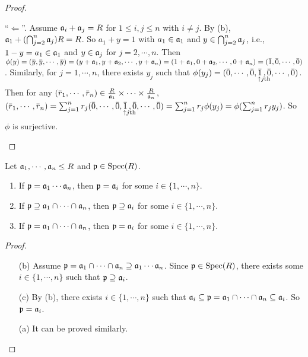 \begin{proof}
\begin{enumerate}
            ``$\Leftarrow$''. Assume $\mathfrak{a}_i + \mathfrak{a}_j = R$ for $1 \leq i,j \leq n$ with $i \neq j$. By (b), $\mathfrak{a}_1 + (\bigcap_{j=2}^n \mathfrak{a}_j)R = R$. So $a_1 + y = 1$ with $a_1 \in \mathfrak{a}_1$ and $y \in \bigcap_{j=2}^n \mathfrak{a}_j$, i.e., $1-y = a_1 \in \mathfrak{a}_1$ and $y \in \mathfrak{a}_j$ for $j = 2,\cdots, n$. Then $\phi(y) = (\overbar y, \overbar y, \cdots, \overbar y) = (y + \ffa_1, y + \ffa_2, \cdots, y + \ffa_n) = (1+\ffa_1,0+\ffa_2,\cdots,0+\ffa_n) = (\overbar 1,\overbar 0, \cdots, \overbar 0)$. Similarly, for $j = 1,\cdots,n$, there exists $y_j$ such that $\phi(y_j) = (\overbar 0, \cdots, \overbar 0, \mathpunct{\underset{\mathclap{\substack{\ \ \ \uparrow j\text{th}\\ \textstyle }}}{\overbar 1}}, \overbar 0, \cdots, \overbar 0)$. Then for any $(\overbar r_1,\cdots, \overbar r_n) \in \frac{R}{\ffa_1} \times \cdots \times \frac{R}{\ffa_n}$, $(\overbar r_1,\cdots, \overbar r_n) = \sum_{j=1}^n r_j(\overbar 0, \cdots, \overbar 0, \mathpunct{\underset{\mathclap{\substack{\ \ \ \uparrow j\text{th} \\ \textstyle }}}{\overbar 1}}, \overbar 0, \cdots, \overbar 0) = \sum_{j=1}^n r_j\phi(y_j) = \phi(\sum_{j=1}^nr_jy_j)$. So $\phi$ is surjective. \qedhere
    \end{enumerate}
\end{proof}

\begin{proposition}\label{1.47}
    Let $\mathfrak{a}_1,\cdots,\mathfrak{a}_n \leq R$ and $\mathfrak{p} \in \operatorname{Spec}(R)$.
    \begin{enumerate}
        \item\label{1.47a} If $\mathfrak{p} = \mathfrak{a}_1 \cdots \mathfrak{a}_n$, then $\mathfrak{p} = \mathfrak{a}_i$ for some $i \in \{1,\cdots,n\}$.
        \item\label{1.47b} If $\mathfrak{p} \supseteq \mathfrak{a}_1 \cap \cdots \cap \mathfrak{a}_n$, then $\mathfrak{p} \supseteq \mathfrak{a}_i$ for some $i \in \{1,\cdots,n\}$.
        \item\label{1.47c} If $\mathfrak{p} = \mathfrak{a}_1 \cap \cdots \cap \mathfrak{a}_n$, then $\mathfrak{p} = \mathfrak{a}_i$ for some $i \in \{1,\cdots,n\}$.
    \end{enumerate}
\end{proposition}

\begin{proof}
    \begin{enumerate}
        \item [(b)] Assume $\mathfrak{p} = \mathfrak{a}_1 \cap \cdots \cap \mathfrak{a}_n \supseteq \mathfrak{a}_1 \cdots \mathfrak{a}_n$. Since $\mathfrak{p} \in \operatorname{Spec}(R)$, there exists some $i \in \{1,\cdots,n\}$ such that $\mathfrak{p} \supseteq \mathfrak{a}_i$. 
        \item[(c)]
            By (b), there exists $i \in \{1,\cdots,n\}$ such that $\mathfrak{a}_i \subseteq \mathfrak{p} = \mathfrak{a}_1 \cap \cdots \cap \mathfrak{a}_n \subseteq \mathfrak{a}_i$. So $\mathfrak{p} = \mathfrak{a}_i$. 
        \item[(a)] It can be proved similarly. \qedhere
    \end{enumerate}
\end{proof}

